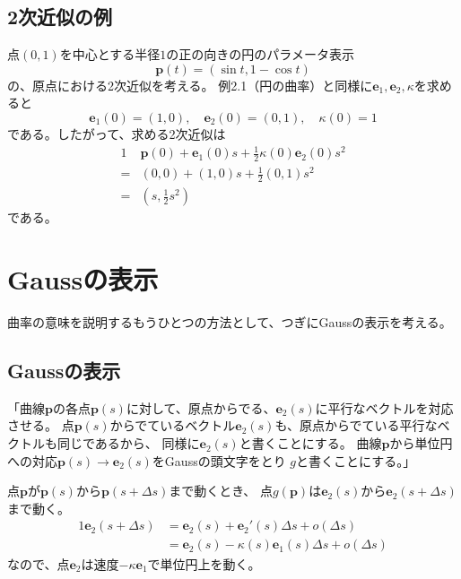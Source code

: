 \documentclass[a4j,disablejfam,dvipdfmx,papersize,slide,uplatex,21pt]{jsarticle}
\begin{document}
\subsection*{2次近似の例}
点$(0, 1)$を中心とする半径$1$の正の向きの円のパラメータ表示
\begin{equation}
    \bm{p}(t) = \left(\sin t, 1 - \cos t\right)
\end{equation}
の、原点における2次近似を考える。
例2.1（円の曲率）と同様に$\bm{e}_1, \bm{e}_2, \kappa$を求めると
\begin{equation}
    \bm{e}_1(0) = (1, 0),\quad
    \bm{e}_2(0) = (0, 1),\quad
    \kappa(0) = 1
\end{equation}
である。したがって、求める2次近似は
\begin{alignat}{1}
      &\bm{p}(0) + \bm{e}_1(0) s + \frac{1}{2} \kappa(0) \bm{e}_2(0) s^2 \\
    = &(0, 0) + (1, 0) s + \frac{1}{2} (0, 1) s^2 \\
    = &\left(s, \frac{1}{2} s^2\right)
\end{alignat}
である。




\section{Gaussの表示}
曲率の意味を説明するもうひとつの方法として、つぎにGaussの表示を考える。

\newpage
\subsection*{Gaussの表示}
「曲線$\bm{p}$の各点$\bm{p}(s)$に対して、原点からでる、$\bm{e}_2(s)$に平行なベクトルを対応させる。
点$\bm{p}(s)$からでているベクトル$\bm{e}_2(s)$も、原点からでている平行なベクトルも同じであるから、
同様に$\bm{e}_2(s)$と書くことにする。
曲線$\bm{p}$から単位円への対応$\bm{p}(s)\rightarrow\bm{e}_2(s)$をGaussの頭文字をとり
$g$と書くことにする。」

\newpage
点$\bm{p}$が$\bm{p}(s)$から$\bm{p}(s + \Delta s)$まで動くとき、
点$g(\bm{p})$は$\bm{e}_2(s)$から$\bm{e}_2(s + \Delta s)$まで動く。
\begin{alignat}{1}
    \bm{e}_2(s + \Delta s)
        &= \bm{e}_2(s) + \bm{e}_2'(s) \Delta s + o(\Delta s) \\
        &= \bm{e}_2(s) - \kappa(s) \bm{e}_1(s) \Delta s + o(\Delta s)
\end{alignat}
なので、点$\bm{e}_2$は速度$-\kappa\bm{e}_1$で単位円上を動く。
\end{document}
